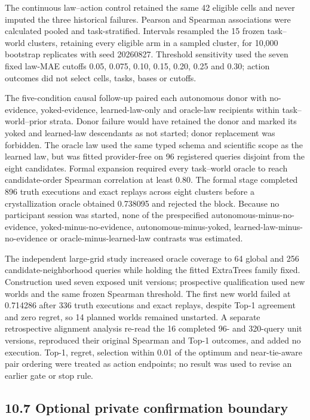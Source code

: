 \documentclass[10pt,twocolumn]{article}
\begin{document}
The continuous law--action control retained the same 42 eligible cells
and never imputed the three historical failures. Pearson and Spearman
associations were calculated pooled and task-stratified. Intervals
resampled the 15 frozen task--world clusters, retaining every eligible
arm in a sampled cluster, for 10,000 bootstrap replicates with seed
20260827. Threshold sensitivity used the seven fixed law-MAE cutoffs
0.05, 0.075, 0.10, 0.15, 0.20, 0.25 and 0.30; action outcomes did not
select cells, tasks, bases or cutoffs.

The five-condition causal follow-up paired each autonomous donor with
no-evidence, yoked-evidence, learned-law-only and oracle-law recipients
within task--world--prior strata. Donor failure would have retained the
donor and marked its yoked and learned-law descendants as not started;
donor replacement was forbidden. The oracle law used the same typed
schema and scientific scope as the learned law, but was fitted
provider-free on 96 registered queries disjoint from the eight
candidates. Formal expansion required every task--world oracle to reach
candidate-order Spearman correlation at least 0.80. The formal stage
completed 896 truth executions and exact replays across eight clusters
before a crystallization oracle obtained 0.738095 and rejected the
block. Because no participant session was started, none of the
prespecified autonomous-minus-no-evidence, yoked-minus-no-evidence,
autonomous-minus-yoked, learned-law-minus-no-evidence or
oracle-minus-learned-law contrasts was estimated.

The independent large-grid study increased oracle coverage to 64 global
and 256 candidate-neighborhood queries while holding the fitted
ExtraTrees family fixed. Construction used seven exposed unit versions;
prospective qualification used new worlds and the same frozen Spearman
threshold. The first new world failed at 0.714286 after 336 truth
executions and exact replays, despite Top-1 agreement and zero regret,
so 14 planned worlds remained unstarted. A separate retrospective
alignment analysis re-read the 16 completed 96- and 320-query unit
versions, reproduced their original Spearman and Top-1 outcomes, and
added no execution. Top-1, regret, selection within 0.01 of the optimum
and near-tie-aware pair ordering were treated as action endpoints; no
result was used to revise an earlier gate or stop rule.

\subsection{10.7 Optional private confirmation
boundary}\label{optional-private-confirmation-boundary}
\end{document}
